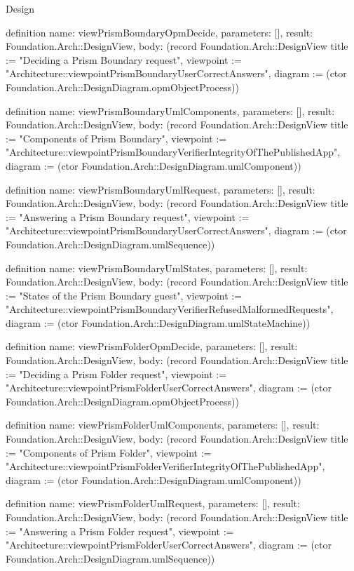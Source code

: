 \begin{lexlean}{Design}
\begin{semanticmodule}
definition{
  name: viewPrismBoundaryOpmDecide,
  parameters: [],
  result: Foundation.Arch::DesignView,
  body: (record Foundation.Arch::DesignView {title := "Deciding a Prism Boundary request", viewpoint := "Architecture::viewpointPrismBoundaryUserCorrectAnswers", diagram := (ctor Foundation.Arch::DesignDiagram.opmObjectProcess)})
}

definition{
  name: viewPrismBoundaryUmlComponents,
  parameters: [],
  result: Foundation.Arch::DesignView,
  body: (record Foundation.Arch::DesignView {title := "Components of Prism Boundary", viewpoint := "Architecture::viewpointPrismBoundaryVerifierIntegrityOfThePublishedApp", diagram := (ctor Foundation.Arch::DesignDiagram.umlComponent)})
}

definition{
  name: viewPrismBoundaryUmlRequest,
  parameters: [],
  result: Foundation.Arch::DesignView,
  body: (record Foundation.Arch::DesignView {title := "Answering a Prism Boundary request", viewpoint := "Architecture::viewpointPrismBoundaryUserCorrectAnswers", diagram := (ctor Foundation.Arch::DesignDiagram.umlSequence)})
}

definition{
  name: viewPrismBoundaryUmlStates,
  parameters: [],
  result: Foundation.Arch::DesignView,
  body: (record Foundation.Arch::DesignView {title := "States of the Prism Boundary guest", viewpoint := "Architecture::viewpointPrismBoundaryVerifierRefusedMalformedRequests", diagram := (ctor Foundation.Arch::DesignDiagram.umlStateMachine)})
}

definition{
  name: viewPrismFolderOpmDecide,
  parameters: [],
  result: Foundation.Arch::DesignView,
  body: (record Foundation.Arch::DesignView {title := "Deciding a Prism Folder request", viewpoint := "Architecture::viewpointPrismFolderUserCorrectAnswers", diagram := (ctor Foundation.Arch::DesignDiagram.opmObjectProcess)})
}

definition{
  name: viewPrismFolderUmlComponents,
  parameters: [],
  result: Foundation.Arch::DesignView,
  body: (record Foundation.Arch::DesignView {title := "Components of Prism Folder", viewpoint := "Architecture::viewpointPrismFolderVerifierIntegrityOfThePublishedApp", diagram := (ctor Foundation.Arch::DesignDiagram.umlComponent)})
}

definition{
  name: viewPrismFolderUmlRequest,
  parameters: [],
  result: Foundation.Arch::DesignView,
  body: (record Foundation.Arch::DesignView {title := "Answering a Prism Folder request", viewpoint := "Architecture::viewpointPrismFolderUserCorrectAnswers", diagram := (ctor Foundation.Arch::DesignDiagram.umlSequence)})
}


\end{semanticmodule}
\end{lexlean}
